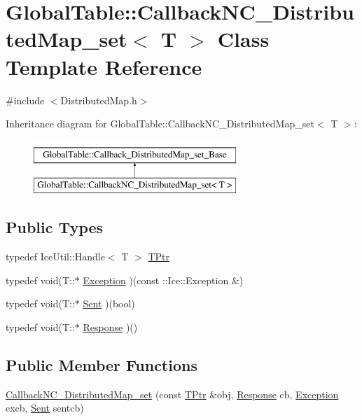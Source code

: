 \hypertarget{class_global_table_1_1_callback_n_c___distributed_map__set}{
\section{GlobalTable::CallbackNC\_\-DistributedMap\_\-set$<$ T $>$ Class Template Reference}
\label{class_global_table_1_1_callback_n_c___distributed_map__set}
}


{\ttfamily \#include $<$DistributedMap.h$>$}

Inheritance diagram for GlobalTable::CallbackNC\_\-DistributedMap\_\-set$<$ T $>$:\begin{figure}[H]
\begin{center}
\leavevmode
\includegraphics[height=2cm]{class_global_table_1_1_callback_n_c___distributed_map__set}
\end{center}
\end{figure}
\subsection*{Public Types}
\begin{DoxyCompactItemize}
\item 
typedef IceUtil::Handle$<$ T $>$ \hyperlink{class_global_table_1_1_callback_n_c___distributed_map__set_aa2cd13e86a05ff06d62c01479a968803}{TPtr}
\item 
typedef void(T::$\ast$ \hyperlink{class_global_table_1_1_callback_n_c___distributed_map__set_afabef2e6a31d7617d88daa1e62b65d27}{Exception} )(const ::Ice::Exception \&)
\item 
typedef void(T::$\ast$ \hyperlink{class_global_table_1_1_callback_n_c___distributed_map__set_ac7f200ec224e006c6471dac69dd79509}{Sent} )(bool)
\item 
typedef void(T::$\ast$ \hyperlink{class_global_table_1_1_callback_n_c___distributed_map__set_a7445ecdd91bde149b92e19754db630e0}{Response} )()
\end{DoxyCompactItemize}
\subsection*{Public Member Functions}
\begin{DoxyCompactItemize}
\item 
\hyperlink{class_global_table_1_1_callback_n_c___distributed_map__set_aeb63a1a191cf79f85d5ad06aa815b15b}{CallbackNC\_\-DistributedMap\_\-set} (const \hyperlink{class_global_table_1_1_callback_n_c___distributed_map__set_aa2cd13e86a05ff06d62c01479a968803}{TPtr} \&obj, \hyperlink{class_global_table_1_1_callback_n_c___distributed_map__set_a7445ecdd91bde149b92e19754db630e0}{Response} cb, \hyperlink{class_global_table_1_1_callback_n_c___distributed_map__set_afabef2e6a31d7617d88daa1e62b65d27}{Exception} excb, \hyperlink{class_global_table_1_1_callback_n_c___distributed_map__set_ac7f200ec224e006c6471dac69dd79509}{Sent} sentcb)
\end{DoxyCompactItemize}
